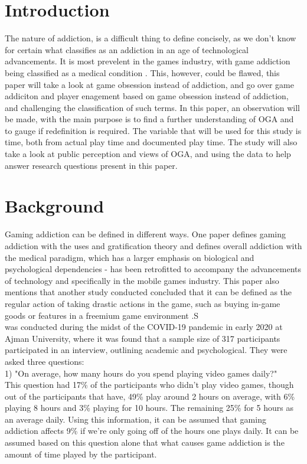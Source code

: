 \documentclass[conference]{IEEEtran}
\begin{document}
\section{Introduction}
The nature of addiction, is a difficult thing to define concisely, as we don't know for certain what classifies as an addiction in an age of technological advancements. It is most prevelent in the games industry, with game addiction being classified as a medical condition \cite{NHSHamp24}. This, however, could be flawed, this paper will take a look at game obsession instead of addiction, and go over game addiciton and player enagement based on game obsession instead of addiction, and challenging the classification of such terms. In this paper, an observation will be made, with the main purpose is to find a further understanding of OGA and to gauge if redefinition is required. The variable that will be used for this study is time, both from actual play time and documented play time. The study will also take a look at public perception and views of OGA, and using the data to help answer research questions present in this paper.

\section{Background}
Gaming addiction can be defined in different ways. One paper \cite{yasir2021} defines gaming addiction with the uses and gratification theory and defines overall addiction with the medical paradigm, which has a larger emphasis on biological and psychological dependencies - has been retrofitted to accompany the advancements of technology and specifically in the mobile games industry. This paper also mentions that another study conducted concluded that it can be defined as the regular action of taking drastic actions in the game, such as buying in-game goods or features in a freemium game environment \cite{XWang2021}.S \\

\cite{Naaj2021} was conducted during the midst of the COVID-19 pandemic in early 2020 at Ajman University, where it was found that a sample size of 317 participants participated in an interview, outlining academic and psychological. They were asked three questions: \\

1) "On average, how many hours do you spend playing video games daily?"\\
This question had 17\%  of the participants who didn't play video games, though out of the participants that have, 49\% play around 2 hours on average, with 6\%  playing 8 hours and 3\% playing for 10 hours. The remaining 25\%  for 5 hours as an average daily. Using this information, it can be assumed that gaming addiction affects 9\% if we're only going off of the hours one plays daily. It can be assumed based on this question alone that what causes game addiction is the amount of time played by the participant.\\
\end{document}
